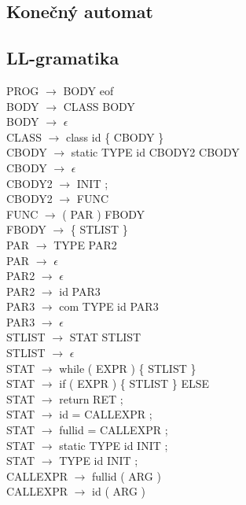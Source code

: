\documentclass[11pt,a4paper]{article}
\begin{document}
\subsection{Konečný automat}
\label{app:automat}


\newpage

\subsection{LL-gramatika}
\label{gramatika}
PROG $\rightarrow$ BODY eof \\
BODY $\rightarrow$ CLASS BODY \\
BODY $\rightarrow$ $\epsilon$ \\
CLASS $\rightarrow$ class id \{ CBODY \} \\
CBODY $\rightarrow$ static TYPE id CBODY2 CBODY \\
CBODY $\rightarrow$ $\epsilon$ \\
CBODY2 $\rightarrow$ INIT ; \\
CBODY2 $\rightarrow$ FUNC \\
FUNC $\rightarrow$ ( PAR ) FBODY \\
FBODY $\rightarrow$ \{ STLIST \} \\
PAR $\rightarrow$ TYPE PAR2 \\
PAR $\rightarrow$ $\epsilon$ \\
PAR2 $\rightarrow$ $\epsilon$ \\
PAR2 $\rightarrow$ id PAR3 \\
PAR3 $\rightarrow$ com TYPE id PAR3 \\
PAR3 $\rightarrow$ $\epsilon$ \\
STLIST $\rightarrow$ STAT STLIST \\
STLIST $\rightarrow$  $\epsilon$ \\
STAT $\rightarrow$ while ( EXPR ) \{ STLIST \} \\
STAT $\rightarrow$ if ( EXPR ) \{ STLIST \} ELSE \\
STAT $\rightarrow$ return RET ; \\
STAT $\rightarrow$ id = CALLEXPR ; \\
STAT $\rightarrow$ fullid = CALLEXPR ; \\
STAT $\rightarrow$ static TYPE id INIT ; \\
STAT $\rightarrow$ TYPE id INIT ; \\
CALLEXPR $\rightarrow$ fullid ( ARG ) \\
CALLEXPR $\rightarrow$ id ( ARG ) \\
\end{document}

